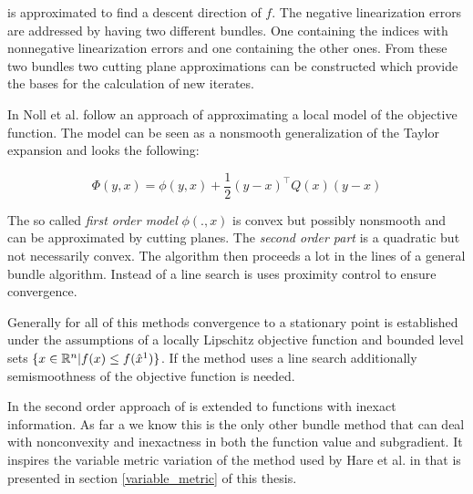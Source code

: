 is approximated to find a descent direction of \(f\).
The negative linearization errors are addressed by having two different bundles. One containing the indices with nonnegative linearization errors and one containing the other ones. From these two bundles two cutting plane approximations can be constructed which provide the bases for the calculation of new iterates.

In \cite{Noll2012} Noll et al. follow an approach of approximating a local model of the objective function. The model can be seen as a nonsmooth generalization of the Taylor expansion and looks the following:

\begin{equation}
	\Phi(y,x) = \phi(y,x)+\frac{1}{2}(y-x)^{\top}Q(x)(y-x)
\label{quad_mod}
\end{equation}

The so called \emph{first order model} \(\phi(.,x)\) is convex but possibly nonsmooth and can be approximated by cutting planes. The \emph{second order part} is a quadratic but not necessarily convex. The algorithm then proceeds a lot in the lines of a general bundle algorithm.
Instead of a line search is uses proximity control to ensure convergence.

Generally for all of this methods convergence to a stationary point is established under the assumptions of a locally Lipschitz objective function and bounded level sets \(\{x \in \mathbb{R}^n | f(x) \leq f(\hat{x}^1)\}\).
If the method uses a line search additionally semismoothness of the objective function is needed.

In \cite{Noll2013} the second order approach of \cite{Noll2012} is extended to functions with inexact information.
As far a we know this is the only other bundle method that can deal with nonconvexity and inexactness in both the function value and subgradient. It inspires the variable metric variation of the method used by Hare et al. in \cite{Hare2016} that is presented in section \ref{variable_metric} of this thesis.

